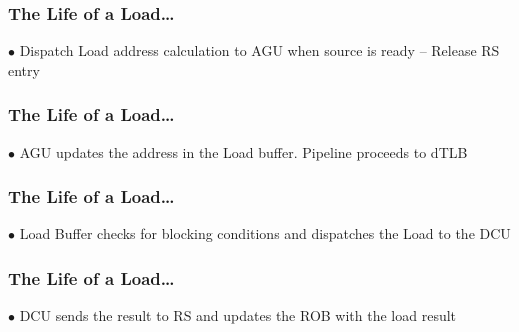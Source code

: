 \documentclass[aspectratio=169,12pt]{beamer}
\begin{document}
\begin{frame}
\frametitle{The Life of a Load\ldots}
\begin{center}
\LoadLifecycleDiagram[
    rat3={RF0},
    robOp={Ld},
    robValid={1},
    robRdy={0},
    robData={X},
    iq1={R3$\leftarrow$MEM(R2+50)},
    lbV={1},
    lbAddr={Invalid},
    lbBC={0},
    agu={R2+50},
    arrows=2
]
\end{center}
\vspace{-3mm}
\scriptsize
$\bullet$ Dispatch Load address calculation to AGU when source is ready -- Release RS entry
\end{frame}

\begin{frame}
\frametitle{The Life of a Load\ldots}
\begin{center}
\LoadLifecycleDiagram[
    rat3={RF0},
    robOp={Ld},
    robValid={1},
    robRdy={0},
    robData={X},
    iq1={R3$\leftarrow$MEM(R2+50)},
    lbV={1},
    lbAddr={V(R2+50)},
    lbBC={0},
    arrows=3
]
\end{center}
\vspace{-3mm}
\scriptsize
$\bullet$ AGU updates the address in the Load buffer. Pipeline proceeds to dTLB
\end{frame}

\begin{frame}
\frametitle{The Life of a Load\ldots}
\begin{center}
\LoadLifecycleDiagram[
    rat3={RF0},
    robOp={Ld},
    robValid={1},
    robRdy={0},
    robData={X},
    iq1={R3$\leftarrow$MEM(R2+50)},
    lbV={1},
    lbAddr={V(R2+50)},
    lbBC={0},
    arrows=4
]
\end{center}
\vspace{-3mm}
\scriptsize
$\bullet$ Load Buffer checks for blocking conditions and dispatches the Load to the DCU
\end{frame}

\begin{frame}
\frametitle{The Life of a Load\ldots}
\begin{center}
\LoadLifecycleDiagram[
    rat3={RF0},
    robOp={Ld},
    robValid={1},
    robRdy={1},
    robData={data},
    iq1={R3$\leftarrow$MEM(R2+50)},
    lbV={1},
    lbAddr={V(R2+50)},
    lbBC={0},
    arrows=4
]
\end{center}
\vspace{-3mm}
\scriptsize
$\bullet$ DCU sends the result to RS and updates the ROB with the load result
\end{frame}
\end{document}
